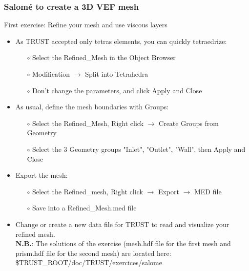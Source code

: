 \documentclass[10pt]{beamer}
\begin{document}
\begin{frame}
\frametitle{Salom\'e to create a 3D VEF mesh}
\begin{block}{First exercise: Refine your mesh and use viscous layers}

\begin{itemize}
\item As TRUST accepted only tetras elements, you can quickly tetraedrize:
    \begin{itemize}
    \item [$\circ$] Select the Refined\_Mesh in the Object Browser
    \item [$\circ$] Modification $\rightarrow$ Split into Tetrahedra
    \item [$\circ$] Don't change the parameters, and click Apply and Close
    \end{itemize}

\item As usual, define the mesh boundaries with Groups:
    \begin{itemize}
    \item [$\circ$] Select the Refined\_Mesh, Right click $\rightarrow$ Create Groups from Geometry
    \item [$\circ$] Select the 3 Geometry groups "Inlet", "Outlet", "Wall", then Apply and Close
    \end{itemize}

\item Export the mesh:
    \begin{itemize}
    \item [$\circ$] Select the Refined\_mesh, Right click $\rightarrow$ Export $\rightarrow$ MED file
    \item [$\circ$] Save into a Refined\_Mesh.med file
    \end{itemize}

\item Change or create a new data file for TRUST to read and visualize your refined mesh.\\
\textbf{N.B.}: The solutions of the exercise (mesh.hdf file for the first mesh and prism.hdf file for the second mesh) are located here: \$TRUST\_ROOT/doc/TRUST/exercices/salome

\end{itemize}

\end{block}
\end{frame}
\end{document}
